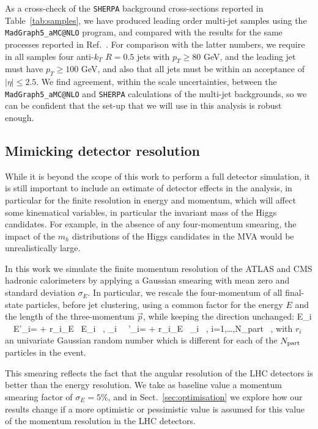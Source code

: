 As a cross-check of the {\tt SHERPA}
background cross-sections reported in Table~\ref{tab:samples}, we have produced leading order
multi-jet samples
using the {\tt MadGraph5\_aMC@NLO} program, and compared with the results for the same processes reported in
Ref.~\cite{Alwall:2014hca}.
%
For comparison with the latter numbers, 
we require in all samples four anti-$k_T$ $R=0.5$ jets with $p_T \ge 80 $ GeV, and the leading jet must have $p_T \ge 100$ GeV, and
also that all jets must be within an acceptance of $|\eta| \le 2.5 $.
%
We find agreement, within the scale uncertainties, between the {\tt MadGraph5\_aMC@NLO} and {\tt SHERPA} calculations of the multi-jet
backgrounds, so we can be confident that the set-up that we will use in this analysis is robust enough.


\subsection{Mimicking detector resolution}


While it is beyond the scope of this work to perform a full
detector simulation, it is still important to include an estimate of detector
effects in the analysis, in particular for the finite resolution
in energy and momentum, which will affect some kinematical variables, in particular
the invariant mass of the Higgs candidates.
%
For example, in the absence of any four-momentum smearing, the impact of the $m_h$
distributions of the Higgs candidates in the MVA
would be unrealistically large.


In this work we simulate the finite momentum resolution of the ATLAS and CMS
hadronic calorimeters by applying a Gaussian smearing
with mean zero and standard deviation $\sigma_E$.
%
In particular, we rescale the four-momentum of all
final-state particles, before jet clustering, using
a common factor for the energy $E$ and the length of the
three-momentum $\vec{p}$, while keeping the direction unchanged:
%
\be
\label{eq:smearing}
E_i \, \to \, E'_i= + r_i\cdot\sigma_E \rp\, E_i \, ,\quad
{}_i \, \to \, '_i= + r_i\cdot\sigma_E \rp\, _i \, , \quad
i=1,\ldots,N_{\rm part} \, ,
\ee
with $r_i$ an univariate Gaussian random number which is different for each
of the $N_{\rm part}$ particles in the event.


This smearing reflects the fact that the angular resolution of the LHC detectors
is better than the energy resolution.
%
We take as baseline value a momentum smearing
factor of $\sigma_E=5\%$, and in
Sect.~\ref{sec:optimisation} we explore how our results change
if a more optimistic or pessimistic value is assumed for this value
of the momentum
resolution in the LHC detectors.

